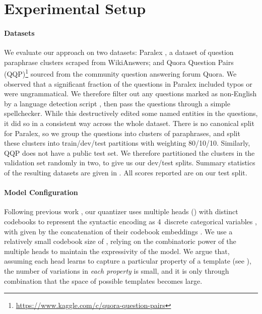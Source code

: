 \documentclass[11pt,a4paper]{article}
\begin{document}
\section{Experimental Setup}

\paragraph{Datasets}

We evaluate our approach on two datasets: Paralex
\cite{fader-etal-2013-paraphrase}, a dataset of question paraphrase
clusters scraped from WikiAnswers; and Quora Question Pairs
(QQP)\footnote{\mbox{\url{https://www.kaggle.com/c/quora-question-pairs}}}
sourced from the community question answering forum Quora.  We
observed that a significant fraction of the questions in Paralex
included typos or were ungrammatical. We therefore filter out any
questions marked as non-English by a language detection script
\cite{lui-baldwin-2012-langid}, then pass the questions through a
simple spellchecker. While this destructively edited some named
entities in the questions, it did so in a consistent way across the
whole dataset. There is no canonical split for Paralex, so we group
the questions into clusters of paraphrases, and split these clusters
into train/dev/test partitions with weighting 80/10/10. Similarly, QQP
does not have a public test set. We therefore partitioned the
clusters in the validation set randomly in two, to give us our
dev/test splits. Summary statistics of the resulting datasets are
given in .  All scores reported are on our test
split.

\paragraph{Model Configuration}

Following previous work
\cite{kaiser-latent-variables,angelidis2020extractive}, our quantizer uses
multiple heads () with distinct codebooks to represent the syntactic encoding as 4~discrete
categorical variables , with  given by the
concatenation of their codebook embeddings . We use a relatively small
codebook size of , relying on the combinatoric power of the
multiple heads to maintain the expressivity of the model. We argue
that, assuming each head learns to capture a particular property of a
template (see ), the number of variations in
\textit{each property} is small, and it is only through combination
that the space of possible templates becomes large.
\end{document}
